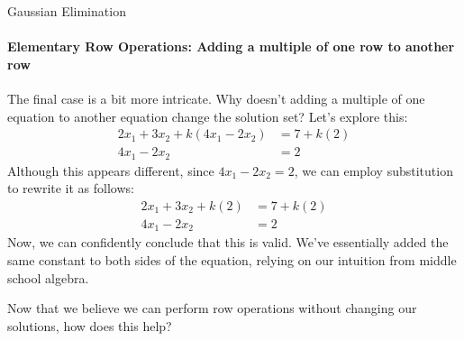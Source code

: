 \documentclass{beamer}
\begin{document}
\begin{frame}{Gaussian Elimination}
\framesubtitle{Elementary Row Operations: Adding a multiple of one row to another row}
The final case is a bit more intricate. Why doesn't adding a multiple of one equation to another equation change the solution set? Let's explore this:
\begin{align*}
    2x_1 + 3x_2 + k(4x_1 - 2x_2) &= 7 + k(2) \\
    4x_1 - 2x_2 &= 2
\end{align*}
Although this appears different, since $4x_1 - 2x_2 = 2$, we can employ substitution to rewrite it as follows:
\begin{align*}
    2x_1 + 3x_2 + k(2) &= 7 + k(2) \\
    4x_1 - 2x_2 &= 2
\end{align*}
Now, we can confidently conclude that this is valid. We've essentially added the same constant to both sides of the equation, relying on our intuition from middle school algebra.

Now that we believe we can perform row operations without changing our solutions, how does this help?
\end{frame}
\end{document}
